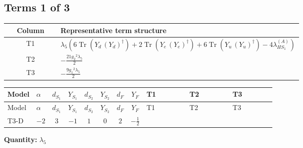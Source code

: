 \documentclass[8pt]{article}
\begin{document}
\begin{landscape}
\subsection*{Terms 1 of 3}
\begin{center}
\begin{tabular}{@{}c >{\raggedright\arraybackslash}p{0.82\linewidth}@{}}
\toprule
Column & Representative term structure \\
\midrule
T1 & \(\displaystyle {\lambda_5} (6 \operatorname{Tr}\!\left({Y_d}\,\left({Y_d}\right)^{\dagger}\right)+2 \operatorname{Tr}\!\left({Y_e}\,\left({Y_e}\right)^{\dagger}\right)+6 \operatorname{Tr}\!\left({Y_u}\,\left({Y_u}\right)^{\dagger}\right)-4 {\lambda_{HS_1}^{(A)}})\) \\
\midrule
T2 & \(\displaystyle -\frac{21 {g_2}^2 {\lambda_5}}{2}\) \\
\midrule
T3 & \(\displaystyle -\frac{9 {g_1}^2 {\lambda_5}}{2}\) \\
\midrule
\bottomrule
\end{tabular}
\end{center}
\smallskip
\tiny
\begin{longtable}{@{}llcccccc >{\raggedright\arraybackslash}p{0.21\linewidth} >{\raggedright\arraybackslash}p{0.21\linewidth} >{\raggedright\arraybackslash}p{0.21\linewidth}@{}}
\toprule
Model & $\alpha$ & $d_{S_1}$ & $Y_{S_1}$ & $d_{S_2}$ & $Y_{S_2}$ & $d_F$ & $Y_F$ & T1 & T2 & T3 \\
\midrule
\endfirsthead
\toprule
Model & $\alpha$ & $d_{S_1}$ & $Y_{S_1}$ & $d_{S_2}$ & $Y_{S_2}$ & $d_F$ & $Y_F$ & T1 & T2 & T3 \\
\midrule
\endhead
T3-D & $-2$ & $3$ & $-1$ & $1$ & $0$ & $2$ & $-\frac{1}{2}$ & \scriptsize\adjustbox{max width=\linewidth}{$\begin{gathered} {\lambda_5} (6 \operatorname{Tr}\!\left({Y_d}\,\left({Y_d}\right)^{\dagger}\right)+2 \operatorname{Tr}\!\left({Y_e}\,\left({Y_e}\right)^{\dagger}\right)+6 \operatorname{Tr}\!\left({Y_u}\,\left({Y_u}\right)^{\dagger}\right)-4 {\lambda_{HS_1}^{(A)}})\end{gathered}$} & \scriptsize\adjustbox{max width=\linewidth}{$\begin{gathered} -\frac{21 {g_2}^2 {\lambda_5}}{2}\end{gathered}$} & \scriptsize\adjustbox{max width=\linewidth}{$\begin{gathered} -\frac{9 {g_1}^2 {\lambda_5}}{2}\end{gathered}$} \\
\midrule
\bottomrule
\end{longtable}
\clearpage
\noindent\textbf{Quantity: }$\lambda_5$\par\smallskip

\end{landscape}
\end{document}
